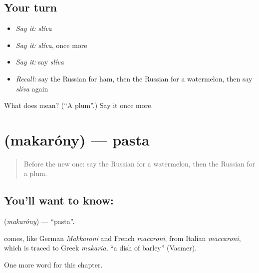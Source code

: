 \subsection*{Your turn}
\begin{itemize}
\raggedright
  \item \emph{Say it:} \emph{slíva}
  \item \emph{Say it:} \emph{slíva}, once more
  \item \emph{Say it:} say \emph{slíva}
  \item \emph{Recall:} say the Russian for ham, then the Russian for a watermelon, then say \emph{slíva} again
\end{itemize}

\begin{tcolorbox}[breakable,colback=teal!4,colframe=teal!35!black,title={Before you move on}]
What does  mean? (\textquotedblleft{}A plum\textquotedblright{}.) Say it once more.
\end{tcolorbox}
\section[\texorpdfstring{\ru{макароны} (makaróny)}{макароны (makaróny)}]{ (makaróny) — pasta}

\label{lesson:RU-C250-makarony}



\begin{quote}
Before the new one: say the Russian for a watermelon, then the Russian for a plum.
\end{quote}

\subsection*{You'll want to know: }
\textbf{} (\emph{makaróny}) — \textquotedblleft{}pasta\textquotedblright{}.

\begin{cousinweb}
\textbf{} comes, like German \emph{Makkaroni} and French \emph{macaroni}, from Italian \emph{maccaroni}, which is traced to Greek \emph{makaría}, \textquotedblleft{}a dish of barley\textquotedblright{} (Vasmer).
\end{cousinweb}

\begin{grammarlens}[title={What you've built}]
One more word for this chapter.
\end{grammarlens}


